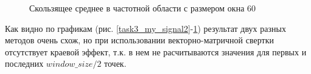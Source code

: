 \documentclass[a4paper,oneside,14pt]{extreport}
\begin{document}
\begin{figure}[h]
	\caption{Скользящее среднее в частотной области с размером окна 60}
	\label{task2_my_signal2}
\end{figure}

Как видно по графикам (рис. \ref{task3_my_signal2}-\ref{task2_my_signal2}) результат двух разных методов очень схож, но при использовании векторно-матричной свертки отсутствует краевой эффект, т.к. в нем не расчитываются значения для первых и последних $window\_size/2$ точек.
\end{document}
